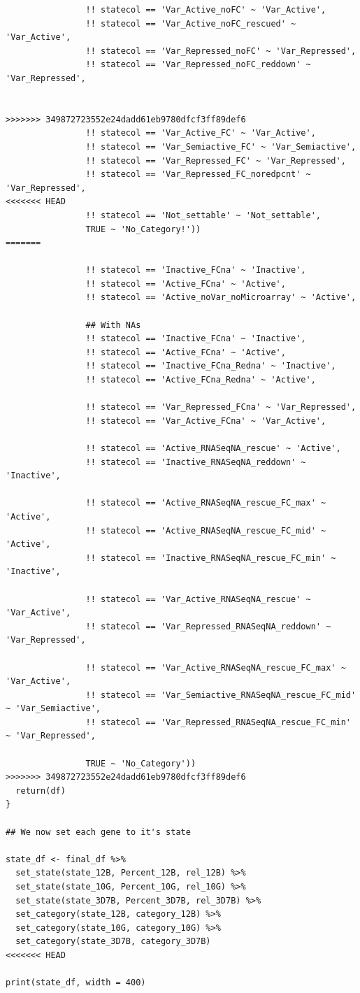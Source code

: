 \documentclass[11pt]{article}
\begin{document}
\begin{verbatim}
                !! statecol == 'Var_Active_noFC' ~ 'Var_Active',
                !! statecol == 'Var_Active_noFC_rescued' ~ 'Var_Active',
                !! statecol == 'Var_Repressed_noFC' ~ 'Var_Repressed',
                !! statecol == 'Var_Repressed_noFC_reddown' ~ 'Var_Repressed',


>>>>>>> 349872723552e24dadd61eb9780dfcf3ff89def6
                !! statecol == 'Var_Active_FC' ~ 'Var_Active',
                !! statecol == 'Var_Semiactive_FC' ~ 'Var_Semiactive',
                !! statecol == 'Var_Repressed_FC' ~ 'Var_Repressed',
                !! statecol == 'Var_Repressed_FC_noredpcnt' ~ 'Var_Repressed',
<<<<<<< HEAD
                !! statecol == 'Not_settable' ~ 'Not_settable',
                TRUE ~ 'No_Category!'))
=======

                !! statecol == 'Inactive_FCna' ~ 'Inactive',
                !! statecol == 'Active_FCna' ~ 'Active',
                !! statecol == 'Active_noVar_noMicroarray' ~ 'Active',

                ## With NAs
                !! statecol == 'Inactive_FCna' ~ 'Inactive',
                !! statecol == 'Active_FCna' ~ 'Active',
                !! statecol == 'Inactive_FCna_Redna' ~ 'Inactive',
                !! statecol == 'Active_FCna_Redna' ~ 'Active',

                !! statecol == 'Var_Repressed_FCna' ~ 'Var_Repressed',
                !! statecol == 'Var_Active_FCna' ~ 'Var_Active',

                !! statecol == 'Active_RNASeqNA_rescue' ~ 'Active',
                !! statecol == 'Inactive_RNASeqNA_reddown' ~ 'Inactive',

                !! statecol == 'Active_RNASeqNA_rescue_FC_max' ~ 'Active',
                !! statecol == 'Active_RNASeqNA_rescue_FC_mid' ~ 'Active',
                !! statecol == 'Inactive_RNASeqNA_rescue_FC_min' ~ 'Inactive',

                !! statecol == 'Var_Active_RNASeqNA_rescue' ~ 'Var_Active',
                !! statecol == 'Var_Repressed_RNASeqNA_reddown' ~ 'Var_Repressed',

                !! statecol == 'Var_Active_RNASeqNA_rescue_FC_max' ~ 'Var_Active',
                !! statecol == 'Var_Semiactive_RNASeqNA_rescue_FC_mid' ~ 'Var_Semiactive',
                !! statecol == 'Var_Repressed_RNASeqNA_rescue_FC_min' ~ 'Var_Repressed',

                TRUE ~ 'No_Category'))
>>>>>>> 349872723552e24dadd61eb9780dfcf3ff89def6
  return(df)
}

## We now set each gene to it's state

state_df <- final_df %>%
  set_state(state_12B, Percent_12B, rel_12B) %>%
  set_state(state_10G, Percent_10G, rel_10G) %>%
  set_state(state_3D7B, Percent_3D7B, rel_3D7B) %>%
  set_category(state_12B, category_12B) %>%
  set_category(state_10G, category_10G) %>%
  set_category(state_3D7B, category_3D7B)
<<<<<<< HEAD

print(state_df, width = 400)
\end{verbatim}
\end{document}
